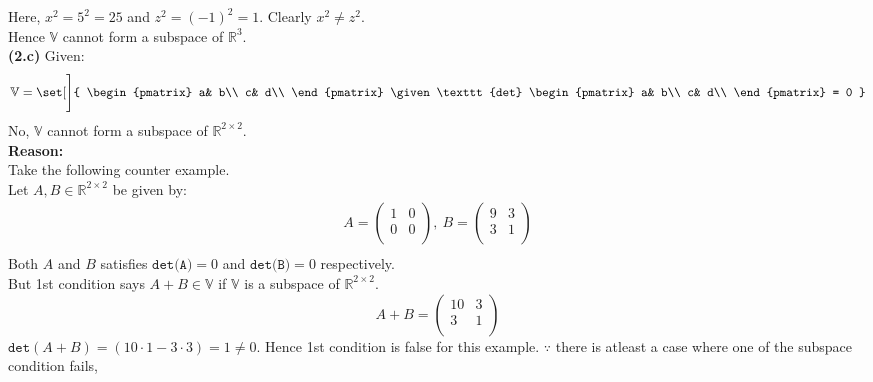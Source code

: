 \documentclass[12pt,letterpaper,fleqn]{article}
\theoremstyle{definition}
\begin{document}
	Here, $x^2 = 5^2 = 25$ and $z^2 = (-1)^2 = 1$. Clearly $x^2 \neq z^2$.\\
	Hence $\mathbb{V}$ cannot form a subspace of $\mathbb{R}^{3}$.
\\
 \textbf{(2.c)} Given:
 	\begin{align*}
	\mathbb{V} = \set[\Bigg]{
	\begin{pmatrix}
	a& b\\
	c& d\\
\end{pmatrix}	\given \texttt{det}
	\begin{pmatrix}
	a& b\\
	c& d\\
	\end{pmatrix} = 0
	}
	\end{align*}
	No, $\mathbb{V}$ cannot form a subspace of $\mathbb{R}^{2 \times 2}$.\\
	\textbf{Reason:}\\
	Take the following counter example.\\
	Let $A,B \in \mathbb{R}^{2 \times 2}$ be given by:
	\begin{equation*}
	\begin{split}
	A =
	\begin{pmatrix}
	1 &0\\
	0 &0\\
	\end{pmatrix},~
	B = 
	\begin{pmatrix}
	9 &3\\
	3 &1\\
	\end{pmatrix}\\
	\end{split}
	\end{equation*}
	Both $A$ and $B$ satisfies $ \texttt{det(A)} = 0$ and $ \texttt{det(B)} = 0$ respectively.\\
	But 1st condition says $A+B \in \mathbb{V}$ if $\mathbb{V}$ is a subspace of $\mathbb{R}^{2 \times 2}$.
	\begin{equation*}
	A + B =
	\begin{pmatrix}
	10 &3\\
	3 &1\\
	\end{pmatrix}
	\end{equation*}
	$\texttt{det}(A+B) = (10 \cdot 1 - 3 \cdot 3) = 1 \neq 0$.
	Hence 1st condition is false for this example. $\because$ there is atleast a case where one of the subspace condition fails,\\
\end{document}
